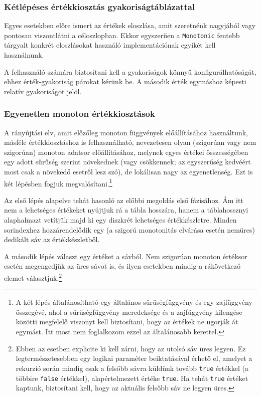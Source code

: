 \documentclass[
    parspace,
    noindent,
    nohyp,
]{elteiktdk}[2023/04/10]
\begin{document}
\subsubsection{Kétlépéses értékkiosztás gyakoriságtáblázattal}

Egyes esetekben előre ismert az értékek eloszlása,
amit szeretnénk nagyjából vagy pontosan viszontlátni a céloszlopban.
Ekkor egyszerűen a \texttt{Monotonic} fentebb tárgyalt konkrét eloszlásokat használó
implementációnak egyikét kell használnunk.

A felhasználó számára biztosítani kell a gyakoriságok könnyű konfigurálhatóságát,
ehhez érték-gyakoriság párokat kérünk be.
A második érték egymáshoz képesti relatív gyakoriságot jelöl.

\subsubsection{Egyenetlen monoton értékkiosztások}

A rányújtási elv, amit előzőleg monoton függvények előállításához használtunk,
másféle értékkiosztáshoz is felhasználható,
nevezetesen olyan (szigorúan vagy nem szigorúan) monoton adatsor előállításához,
melynek egyes értékei összességében egy adott sűrűség szerint növekednek
(vagy csökkennek; az egyszerűség kedvéért most csak a növekedő esetről lesz szó),
de lokálisan nagy az egyenetlenség.
Ezt is két lépésben fogjuk megvalósítani.\footnote{
  A két lépés általánosítható egy általános sűrűségfüggvény és egy zajfüggvény összegévé,
  ahol a sűrűségfüggvény meredeksége és a zajfüggvény kilengése közötti megfelelő viszonyt kell biztosítani,
  hogy az értékek ne ugorják át egymást.
  Itt most nem foglalkozom ezzel az általánosabb kerettel.
}

Az első lépés alapelve tehát hasonló az előbbi megoldás első fázisához.
Ám itt nem a lehetséges értékeket nyújtjuk rá a tábla hosszára,
hanem a táblahossznyi alaphalmazt vetítjük majd ki egy diszkrét lehetséges értékkészletre.
Minden sorindexhez hozzárendelődik egy (a szigorú monotonitás elvárása esetén nemüres)
dedikált sáv az értékkészletből.

A második lépés választ egy értéket a sávból.
Nem szigorúan monoton értéksor esetén megengedjük az üres sávot is,
és ilyen esetekben mindig a rákövetkező elemet választjuk.\footnote{
  Ebben az esetben explicite ki kell zárni, hogy az utolsó sáv üres legyen.
  Ez legtermészetesebben egy logikai paraméter beiktatásával érhető el,
  amelyet a rekurzió során mindig csak a felsőbb sávra küldünk tovább \texttt{true} értékkel
  (a többire \texttt{false} értékkel),
  alapértelmezett értéke \texttt{true}.
  Ha tehát \texttt{true} értéket kaptunk, biztosítani kell, hogy az aktuális felsőbb sáv ne legyen üres.
}
\end{document}
